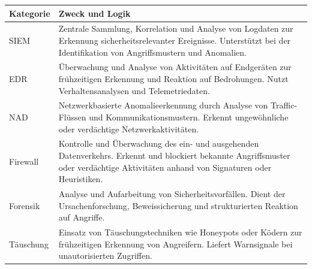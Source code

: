 \renewcommand{\arraystretch}{1.3}
\begin{tabularx}{\textwidth}{@{}p{4cm}X@{}}
\toprule
\textbf{Kategorie} & \textbf{Zweck und Logik} \\
\midrule
SIEM & Zentrale Sammlung, Korrelation und Analyse von Logdaten zur Erkennung sicherheitsrelevanter Ereignisse. Unterstützt bei der Identifikation von Angriffsmustern und Anomalien. \\
\addlinespace
EDR & Überwachung und Analyse von Aktivitäten auf Endgeräten zur frühzeitigen Erkennung und Reaktion auf Bedrohungen. Nutzt Verhaltensanalysen und Telemetriedaten. \\
\addlinespace
NAD & Netzwerkbasierte Anomalieerkennung durch Analyse von Traffic-Flüssen und Kommunikationsmustern. Erkennt ungewöhnliche oder verdächtige Netzwerkaktivitäten. \\
\addlinespace
Firewall & Kontrolle und Überwachung des ein- und ausgehenden Datenverkehrs. Erkennt und blockiert bekannte Angriffsmuster oder verdächtige Aktivitäten anhand von Signaturen oder Heuristiken. \\

\addlinespace
Forensik & Analyse und Aufarbeitung von Sicherheitsvorfällen. Dient der Ursachenforschung, Beweissicherung und strukturierten Reaktion auf Angriffe. \\
\addlinespace
Täuschung & Einsatz von Täuschungstechniken wie Honeypots oder Ködern zur frühzeitigen Erkennung von Angreifern. Liefert Warnsignale bei unautorisierten Zugriffen. \\
\bottomrule
\end{tabularx}
\caption{Übersicht sicherheitsrelevanter Technologien und deren Funktionslogik}
\label{tab:sicherheitstechnologien}
